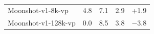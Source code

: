 \begin{table}[t]
\begin{tabular}{l c c c c}
  Moonshot-v1-8k-vp      & 4.8           & 7.1           & 2.9           & +1.9  \\                                                                   
  Moonshot-v1-128k-vp    & 0.0           & 8.5           & 3.8           & $-$3.8 \\                                                                  
  \bottomrule                                                                                                                                         
  \end{tabular}                                                                                                                                       
  \end{table}                 

